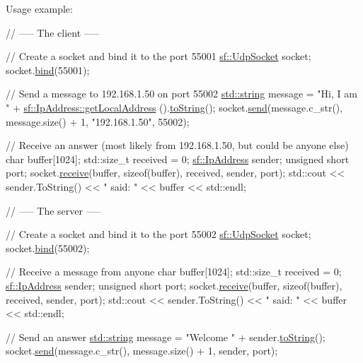 Usage example\-: 
\begin{DoxyCode}
\textcolor{comment}{// ----- The client -----}

\textcolor{comment}{// Create a socket and bind it to the port 55001}
\hyperlink{classsf_1_1_udp_socket}{sf::UdpSocket} socket;
socket.\hyperlink{classsf_1_1_udp_socket_ab0bf8d32849836f92beb2fd734565481}{bind}(55001);

\textcolor{comment}{// Send a message to 192.168.1.50 on port 55002}
\hyperlink{gl3_8h_ac83513893df92266f79a515488701770}{std::string} message = \textcolor{stringliteral}{"Hi, I am "} + \hyperlink{classsf_1_1_ip_address_a4c31622ad87edca48adbb8e8ed00ee4a}{sf::IpAddress::getLocalAddress}
      ().\hyperlink{classsf_1_1_ip_address_a52f4be92fb0ceb689abc469e4a85fd82}{toString}();
socket.\hyperlink{classsf_1_1_udp_socket_a664ab8f26f37c21cc4de1b847c2efcca}{send}(message.c\_str(), message.size() + 1, \textcolor{stringliteral}{"192.168.1.50"}, 55002);

\textcolor{comment}{// Receive an answer (most likely from 192.168.1.50, but could be anyone else)}
\textcolor{keywordtype}{char} buffer[1024];
std::size\_t received = 0;
\hyperlink{classsf_1_1_ip_address}{sf::IpAddress} sender;
\textcolor{keywordtype}{unsigned} \textcolor{keywordtype}{short} port;
socket.\hyperlink{classsf_1_1_udp_socket_ade9ca0f7ed7919136917b0b997a9833a}{receive}(buffer, \textcolor{keyword}{sizeof}(buffer), received, sender, port);
std::cout << sender.ToString() << \textcolor{stringliteral}{" said: "} << buffer << std::endl;

\textcolor{comment}{// ----- The server -----}

\textcolor{comment}{// Create a socket and bind it to the port 55002}
\hyperlink{classsf_1_1_udp_socket}{sf::UdpSocket} socket;
socket.\hyperlink{classsf_1_1_udp_socket_ab0bf8d32849836f92beb2fd734565481}{bind}(55002);

\textcolor{comment}{// Receive a message from anyone}
\textcolor{keywordtype}{char} buffer[1024];
std::size\_t received = 0;
\hyperlink{classsf_1_1_ip_address}{sf::IpAddress} sender;
\textcolor{keywordtype}{unsigned} \textcolor{keywordtype}{short} port;
socket.\hyperlink{classsf_1_1_udp_socket_ade9ca0f7ed7919136917b0b997a9833a}{receive}(buffer, \textcolor{keyword}{sizeof}(buffer), received, sender, port);
std::cout << sender.ToString() << \textcolor{stringliteral}{" said: "} << buffer << std::endl;

\textcolor{comment}{// Send an answer}
\hyperlink{gl3_8h_ac83513893df92266f79a515488701770}{std::string} message = \textcolor{stringliteral}{"Welcome "} + sender.\hyperlink{classsf_1_1_ip_address_a52f4be92fb0ceb689abc469e4a85fd82}{toString}();
socket.\hyperlink{classsf_1_1_udp_socket_a664ab8f26f37c21cc4de1b847c2efcca}{send}(message.c\_str(), message.size() + 1, sender, port);
\end{DoxyCode}


